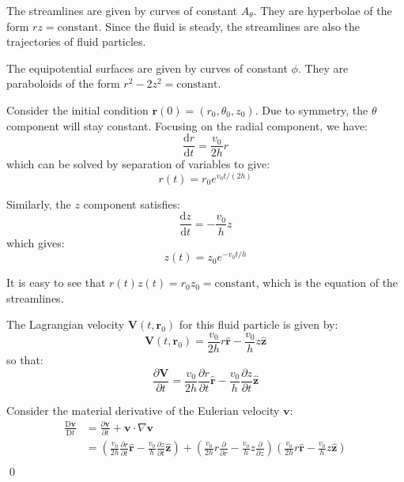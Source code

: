 \documentclass[12pt]{article}
\begin{document}
The streamlines are given by curves of constant $A_{\theta}$. They are hyperbolae of the form $r z = \text{constant}$. Since the fluid is steady, the streamlines are also the trajectories of fluid particles.

The equipotential surfaces are given by curves of constant $\phi$. They are paraboloids of the form $r^{2} - 2z^{2} = \text{constant}$.

Consider the initial condition $\mathbf{r}(0) = (r_{0}, \theta_{0}, z_{0})$. Due to symmetry, the $\theta$ component will stay constant. Focusing on the radial component, we have:
\begin{equation}
    \frac{\mathrm{d}r}{\mathrm{d}t} = \frac{v_{0}}{2h} r
\end{equation}
which can be solved by separation of variables to give:
\begin{equation}
    r(t) = r_{0} e^{v_{0} t/(2h)}
\end{equation}

Similarly, the $z$ component satisfies:
\begin{equation}
    \frac{\mathrm{d}z}{\mathrm{d}t} = -\frac{v_{0}}{h} z
\end{equation}
which gives:
\begin{equation}
    z(t) = z_{0} e^{-v_{0} t/h}
\end{equation}

It is easy to see that $r(t) z(t) = r_{0} z_{0} = \text{constant}$, which is the equation of the streamlines.

The Lagrangian velocity $\mathbf{V}(t, \mathbf{r}_{0})$ for this fluid particle is given by:
\begin{equation}
    \mathbf{V}(t, \mathbf{r}_{0}) = \frac{v_{0}}{2h} r \mathbf{\hat{r}} - \frac{v_{0}}{h} z \mathbf{\hat{z}}
\end{equation}
so that:
\begin{equation}
    \frac{\partial \mathbf{V}}{\partial t} = \frac{v_{0}}{2h} \frac{\partial r}{\partial t} \mathbf{\hat{r}} - \frac{v_{0}}{h} \frac{\partial z}{\partial t} \mathbf{\hat{z}}
\end{equation}

Consider the material derivative of the Eulerian velocity $\mathbf{v}$:
\begin{equation}
    \begin{split}
        \frac{\mathrm{D} \mathbf{v}}{\mathrm{D} t} &= \frac{\partial \mathbf{v}}{\partial t} + \mathbf{v} \cdot \nabla \mathbf{v} \\
        &= \left( \frac{v_{0}}{2h} \frac{\partial r}{\partial t} \hat{\mathbf{r}} - \frac{v_{0}}{h} \frac{\partial z}{\partial t} \hat{\mathbf{z}} \right) + \left( \frac{v_{0}}{2h} r \frac{\partial }{\partial r} - \frac{v_{0}}{h} z \frac{\partial }{\partial z} \right) \left( \frac{v_{0}}{2h} r \hat{\mathbf{r}} - \frac{v_{0}}{h} z \hat{\mathbf{z}} \right) \\
    \end{split}
\end{equation}
\qed
\end{document}
